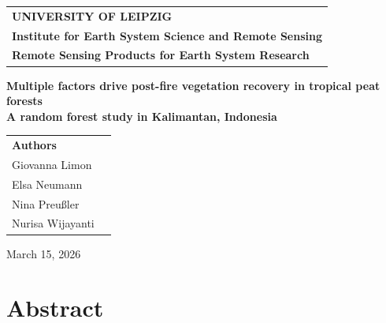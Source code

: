 \documentclass[
  fontsize=12pt,
  paper=a4,
  parskip=half,
  headings=big,
  DIV=12
]{scrreprt}
\begin{document}
\begin{titlepage}
    \thispagestyle{empty}
    \begin{large}
        \begin{tabular}{@{}p{\textwidth}@{}}
            \textbf{UNIVERSITY OF LEIPZIG}\\
            \textbf{Institute for Earth System Science and Remote Sensing} \\
            \textbf{Remote Sensing Products for Earth System Research} \\
        \end{tabular}
    \end{large}
    \vspace{25mm}
    \begin{center}
        \vspace{20mm}
        \LARGE{\textbf{Multiple factors drive post-fire vegetation recovery in tropical peat forests \\ A random forest study in Kalimantan, Indonesia}} \\
        \vspace{25mm}
        \begin{normalsize}
            \begin{tabular}{ll}
                \textbf{Authors} & \\[6pt]
                Giovanna Limon \\
                Elsa Neumann \\
                Nina Preu\ss ler \\
                Nurisa Wijayanti \\
            \end{tabular}
        \end{normalsize}
        \vfill
        \normalsize{March 15, 2026}
    \end{center}
\end{titlepage}

\chapter*{Abstract}
\end{document}
